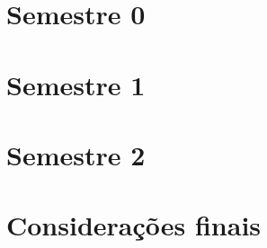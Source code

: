 \acresetall
\section{Semestre 0}
\section{Semestre 1}
\section{Semestre 2}
\section{Considerações finais}
